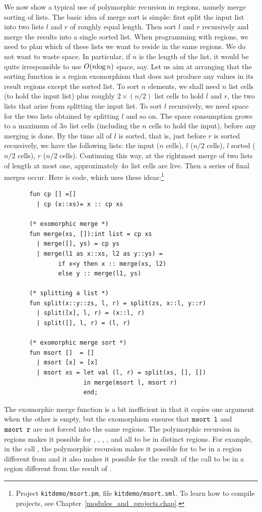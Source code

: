 \documentclass[12pt]{book}
\begin{document}
We now show a typical use of polymorphic recursion in regions, namely
merge sorting of lists. The basic idea of merge sort is simple: first
split the input list into two lists $l$ and $r$ of roughly equal length.
Then sort $l$ and $r$ recursively and merge the results into a single sorted
list.  When programming with regions, we need to plan which of these lists
we want to reside in the same regions. We do not want to waste space. In particular,
if $n$ is the length of the list, it would be quite irresponsible
to use $O(n\hbox{log}\,n)$ space, say.  
Let us aim at arranging that the sorting function is a 
region exomorphism that does not produce any values in its result regions
except the sorted list. To sort $n$ elements, we shall need $n$ list cells 
(to hold the input list) plus roughly $2\times(n/2)$ list cells
to hold $l$ and $r$, the two lists that arise from splitting the input list. To sort $l$ recursively, we need space for the two
lists obtained by splitting $l$ and so on. The space consumption grows to a maximum of $3n$ list cells
(including the $n$ cells to hold the input), before any merging is done.
By the time all of $l$ is sorted, that is, just before $r$ is sorted recursively,
we have the following lists: the input 
($n$ cells), $l$ ($n/2$ cells), $l$ sorted ($n/2$ cells),
$r$ ($n/2$ cells). Continuing this way,
at the rightmost merge of two lists of length at most one, 
approximately $4n$ list cells are live. 
Then a series of final merges occur. 
Here is code, which
uses these ideas:\footnote{Project {\tt kitdemo/msort.pm}, file {\tt kitdemo/msort.sml}. To learn how to compile projects, see Chapter~\ref{modules_and_projects.chap}.}
\pagebreak
\begin{verbatim}
       fun cp [] =[]
         | cp (x::xs)= x :: cp xs

       (* exomorphic merge *)
       fun merge(xs, []):int list = cp xs
         | merge([], ys) = cp ys
         | merge(l1 as x::xs, l2 as y::ys) = 
               if x<y then x :: merge(xs, l2) 
               else y :: merge(l1, ys)

       (* splitting a list *)
       fun split(x::y::zs, l, r) = split(zs, x::l, y::r)
         | split([x], l, r) = (x::l, r)
         | split([], l, r) = (l, r)

       (* exomorphic merge sort *)
       fun msort []  = []
         | msort [x] = [x]
         | msort xs = let val (l, r) = split(xs, [], [])
                      in merge(msort l, msort r)
                      end;
\end{verbatim}
The exomorphic merge function is a bit inefficient in that it copies
one argument when the other is empty, but the exomorphism ensures that
$\hbox{\tt msort l}$ and $\hbox{\tt msort r}$ are not forced into the same
regions. The polymorphic recursion in regions makes it possible for
, , , , and 
all to be in distinct regions. For example, in the call , the polymorphic recursion makes it possible for  to be
in a region different from  and it also makes it possible for
the result of the call to be in a region different from the result of
.
\end{document}
